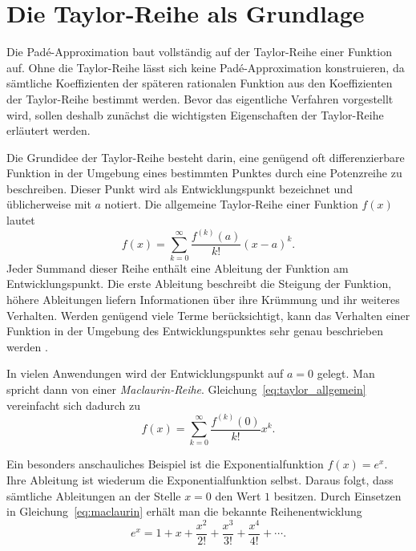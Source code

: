 %
\section{Die Taylor-Reihe als Grundlage}
\label{pade:section:taylor}

Die Padé-Approximation baut vollständig auf der Taylor-Reihe einer Funktion auf. Ohne die Taylor-Reihe lässt sich keine Padé-Approximation konstruieren, da sämtliche Koeffizienten der späteren rationalen Funktion aus den Koeffizienten der Taylor-Reihe bestimmt werden. Bevor das eigentliche Verfahren vorgestellt wird, sollen deshalb zunächst die wichtigsten Eigenschaften der Taylor-Reihe erläutert werden.

Die Grundidee der Taylor-Reihe besteht darin, eine genügend oft differenzierbare Funktion in der Umgebung eines bestimmten Punktes durch eine Potenzreihe zu beschreiben. Dieser Punkt wird als Entwicklungspunkt bezeichnet und üblicherweise mit \(a\) notiert. Die allgemeine Taylor-Reihe einer Funktion \(f(x)\) lautet
\begin{equation}
	f(x)
	=
	\sum_{k=0}^{\infty}
	\frac{f^{(k)}(a)}{k!}(x-a)^k.
	\label{eq:taylor_allgemein}
\end{equation}
Jeder Summand dieser Reihe enthält eine Ableitung der Funktion am Entwicklungspunkt. Die erste Ableitung beschreibt die Steigung der Funktion, höhere Ableitungen liefern Informationen über ihre Krümmung und ihr weiteres Verhalten. Werden genügend viele Terme berücksichtigt, kann das Verhalten einer Funktion in der Umgebung des Entwicklungspunktes sehr genau beschrieben werden \cite{phillips_taylor_1996}.

In vielen Anwendungen wird der Entwicklungspunkt auf \(a=0\) gelegt. Man spricht dann von einer \emph{Maclaurin-Reihe}. Gleichung~\eqref{eq:taylor_allgemein} vereinfacht sich dadurch zu
%
\begin{equation}
	f(x)
	=
	\sum_{k=0}^{\infty}
	\frac{f^{(k)}(0)}{k!}x^k.
	\label{eq:maclaurin}
\end{equation}

Ein besonders anschauliches Beispiel ist die Exponentialfunktion \(f(x)=e^x\). Ihre Ableitung ist wiederum die Exponentialfunktion selbst. Daraus folgt, dass sämtliche Ableitungen an der Stelle \(x=0\) den Wert \(1\) besitzen. Durch Einsetzen in Gleichung~\eqref{eq:maclaurin} erhält man die bekannte Reihenentwicklung
%
\begin{equation*}
	e^x
	=
	1
	+
	x
	+
	\frac{x^2}{2!}
	+
	\frac{x^3}{3!}
	+
	\frac{x^4}{4!}
	+
	\cdots.
\end{equation*}

